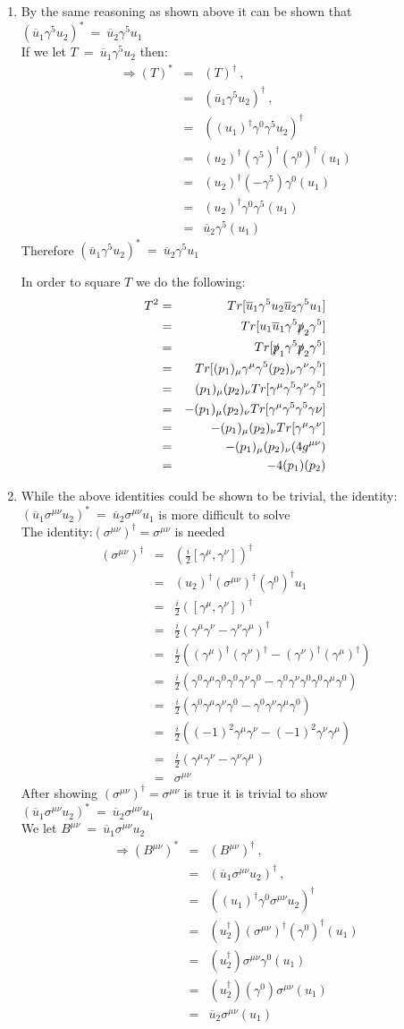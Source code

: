 \documentclass[12pt]{article}
\def \bea{\begin{eqnarray}}
\def \eea{\end{eqnarray}}
\def \nn{\nonumber}
\def \nl{\nn \\}
\def \ou{\overline{u}}
\def \ga{\gamma}
\def \si{\sigma}
\begin{document}
\begin{enumerate}
\item By the same reasoning as shown above it can be shown that $(\ou_1 \ga^5 u_2)^* ~=~ \ou_2 \ga^5 u_1$ \nl
If we let $T ~=~ \ou_1\ga^5 u_2$ then:
\bea
\Rightarrow (T)^* &=& (T)^\dag ~,~~ \\ 
&=& (\ou_1\ga^5 u_2)^\dag ~,~~ \nl 
&=& ((u_1)^\dag\ga^0\ga^5 u_2)^\dag \nl 
&=& (u_2)^\dag(\ga^5)^\dag (\ga^0)^\dag(u_1)\nl 
&=& (u_2)^\dag(-\ga^5) \ga^0(u_1)\nl 
&=& (u_2)^\dag \ga^0\ga^5(u_1)\nl
&=& \ou_2\ga^5(u_1) 
\eea 
Therefore  $(\ou_1 \ga^5 u_2)^* ~=~ \ou_2 \ga^5 u_1$

In order to square $T$ we do the following: 
\bea 
T^2&=& Tr[\ou_1 \ga^5 u_2\ou_2 \ga^5 u_1] \\  
&=& Tr[u_1 \ou_1 \ga^5 \slashed{p}_2 \ga^5] \nl 
&=& Tr[\slashed{p}_1 \ga^5 \slashed{p}_2 \ga^5] \nl 
&=& Tr[(p_1)_\mu \ga^\mu \ga^5 (p_2)_\nu \ga^\nu \ga^5] \nl 
&=& (p_1)_\mu(p_2)_\nu Tr[\ga^\mu\ga^5\ga^\nu\ga^5] \nl 
&=& -(p_1)_\mu(p_2)_\nu Tr[\ga^\mu\ga^5\ga^5\ga\nu]\nl 
&=& -(p_1)_\mu(p_2)_\nu Tr[\ga^\mu\ga^\nu]\nl 
&=& -(p_1)_\mu(p_2)_\nu (4g^{\mu\nu})\nl 
&=& -4(p_1)(p_2) \nl
\eea

\item While the above identities could be shown to be trivial, the identity: $(\ou_1 \si^{\mu\nu} u_2)^* ~=~\ou_2 \si^{\mu\nu} u_1$ is more difficult to solve \nl
The identity:$(\si^{\mu\nu})^\dag =\si^{\mu\nu}$ is needed
\bea 
(\si^{\mu\nu})^\dag &=& (\frac{i}{2}[\ga^\mu,\ga^\nu])^\dag \\ 
&=&(u_2)^\dag (\si^{\mu\nu})^\dag (\ga^0)^\dag u_1 \nl  
&=& \frac{i}{2}([\ga^\mu,\ga^\nu])^\dag\nl
&=& \frac{i}{2}(\ga^\mu\ga^\nu-\ga^\nu\ga^\mu)^\dag \nl 
&=& \frac{i}{2}((\ga^\mu)^\dag(\ga^\nu)^\dag-(\ga^\nu)^\dag(\ga^\mu)^\dag) \nl 
&=& \frac{i}{2}(\ga^0\ga^\mu\ga^0\ga^0\ga^\nu\ga^0-\ga^0\ga^\nu\ga^0\ga^0\ga^\mu\ga^0)\nl 
&=& \frac{i}{2}(\ga^0\ga^\mu\ga^\nu\ga^0-\ga^0\ga^\nu \ga^\mu\ga^0)\nl 
&=& \frac{i}{2}((-1)^2\ga^\mu\ga^\nu-(-1)^2\ga^\nu \ga^\mu) \nl 
&=& \frac{i}{2}(\ga^\mu\ga^\nu-\ga^\nu \ga^\mu)\nl
&=& \si^{\mu\nu}
\eea 
After showing $(\si^{\mu\nu})^\dag =\si^{\mu\nu}$ is true it is trivial to show $(\ou_1 \si^{\mu\nu} u_2)^* ~=~\ou_2 \si^{\mu\nu} u_1$ \nl
We let $B^{\mu\nu} ~=~ \ou_1 \si^{\mu\nu} u_2$
\bea
\Rightarrow (B^{\mu\nu})^* &=& (B^{\mu\nu})^\dag ~,~~ \\ 
&=& (\ou_1 \si^{\mu\nu} u_2)^\dag ~,~~ \nl 
&=& ((u_1)^\dag \ga^0 \si^{\mu\nu} u_2)^\dag \nl 
&=& (u_2^\dag)(\si^{\mu\nu})^\dag (\ga^0)^\dag(u_1)\nl 
&=& (u_2^\dag)\si^{\mu\nu}\ga^0(u_1)\nl 
&=& (u_2^\dag)(\ga^0)\si^{\mu\nu}(u_1)\nl
&=& \ou_2 \si^{\mu\nu}(u_1)
\eea 


\end{enumerate}
\end{document}

